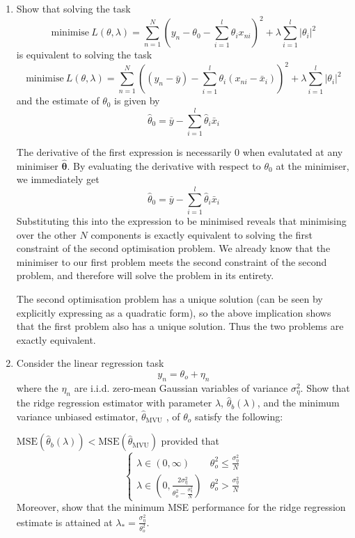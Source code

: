 \documentclass{article}
\newcommand{\chapternumber}{3}
\newenvironment{QandA}{\begin{enumerate}[label=\chapternumber.\arabic*]\bfseries\boldmath}
	{\end{enumerate}}
\newenvironment{answered}{\par\bigskip\normalfont\unboldmath}{}
\begin{document}
\begin{QandA}
		\item Show that solving the task 
		\[\text{minimise}\ L(\theta,\lambda)=\sum_{n=1}^N\left(y_n-\theta_0-\sum_{i=1}^l\theta_i x_{ni}\right)^2+\lambda\sum_{i=1}^l|\theta_i|^2\]
		is equivalent to solving the task
		\[\text{minimise}\ L(\theta,\lambda)=\sum_{n=1}^N\left((y_n-\bar{y})-\sum_{i=1}^l\theta_i (x_{ni}-\bar{x}_i)\right)^2+\lambda\sum_{i=1}^l|\theta_i|^2\]
		and the estimate of $\theta_0$ is given by
		\[\hat{\theta}_0=\bar{y}-\sum_{i=1}^l\hat{\theta}_i\bar{x}_i\]
		
		\begin{answered}
			The derivative of the first expression is necessarily 0 when evalutated at any minimiser ${\boldsymbol{\hat{\theta}}}$. By evaluating the derivative with respect to $\theta_0$ at the minimiser, we immediately get
			\[\hat{\theta}_0=\bar{y}-\sum_{i=1}^l\hat{\theta}_i\bar{x}_i\]
			Substituting this into the expression to be minimised reveals that minimising over the other $N$ components is exactly equivalent to solving the first constraint of the second optimisation problem. We already know that the minimiser to our first problem meets the second constraint of the second problem, and therefore will solve the problem in its entirety.
			
			The second optimisation problem has a unique solution (can be seen by explicitly expressing as a quadratic form), so the above implication shows that the first problem also has a unique solution. Thus the two problems are exactly equivalent.
		\end{answered}
	
		\item Consider the linear regression task 
		\[y_n = \theta_o+\eta_n\]
		where the $\eta_n$ are i.i.d. zero-mean Gaussian variables of variance $\sigma_\eta^2$. Show that the ridge regression estimator with parameter $\lambda$, $\hat{\theta}_b(\lambda)$, and the minimum variance unbiased estimator, $\hat{\theta}_\text{MVU}$ , of $\theta_o$ satisfy the following: 
		
		$\text{MSE}(\hat{\theta}_b(\lambda))<\text{MSE}(\hat{\theta}_\text{MVU})$ provided that
		\[\begin{cases}
			\lambda\in(0,\infty) & \theta_o^2\leq\frac{\sigma_\eta^2}{N}\\
			\lambda\in\left(0,\frac{2\sigma_\eta^2}{\theta_o^2-\frac{\sigma_\eta^2}{N}}\right) & \theta_o^2>\frac{\sigma_\eta^2}{N}
		\end{cases}\]
	Moreover, show that the minimum MSE performance for the ridge regression estimate is attained at $\lambda_*=\frac{\sigma_\eta^2}{\theta_o^2}$.
	

\end{QandA}
\end{document}
